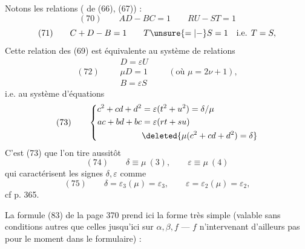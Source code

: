 Notons les relations ( de (66), (67)) :
\[
(70)\qquad AD-BC=1\qquad RU-ST=1
\]
\[
(71)\qquad C+D-B=1\qquad T\unsure{=|-}S=1\quad\text{i.e. }T=S,
\]
Cette relation des  (69)  est équivalente au système de relations
\[
(72)\qquad
\boxed{\begin{gathered}
D=\varepsilon U\\
\mu D=1\\
B=\varepsilon S
\end{gathered}}
\qquad(\text{où }\mu=2\nu+1),
\]
i.e. au système d'équations
\[
(73)\qquad
\left\{\begin{aligned}
c^2+cd+d^2&=\varepsilon(t^2+u^2)=\delta/\mu\\
ac+bd+bc&=\varepsilon(rt+su)\\
&\deleted{\mu(c^2+cd+d^2)=\delta}
\end{aligned}\right.
\]
C'est   (73) que l'on tire aussitôt
\[
(74)\qquad\delta\equiv\mu\ (3),\qquad\varepsilon\equiv\mu\ (4)
\]
qui caractérisent les signes $\delta,\varepsilon$ comme
\[
(75)\qquad\delta=\varepsilon_3(\mu)=\varepsilon_3,\qquad
\varepsilon=\varepsilon_2(\mu)=\varepsilon_2,
\]
cf  p. 365.

La formule (83) de la page 370 prend ici la forme très simple (valable sans conditions autres que celles  jusqu'ici sur $\alpha,\beta,f$ --- $f$ n'intervenant d'ailleurs pas  pour le moment dans le formulaire) :


